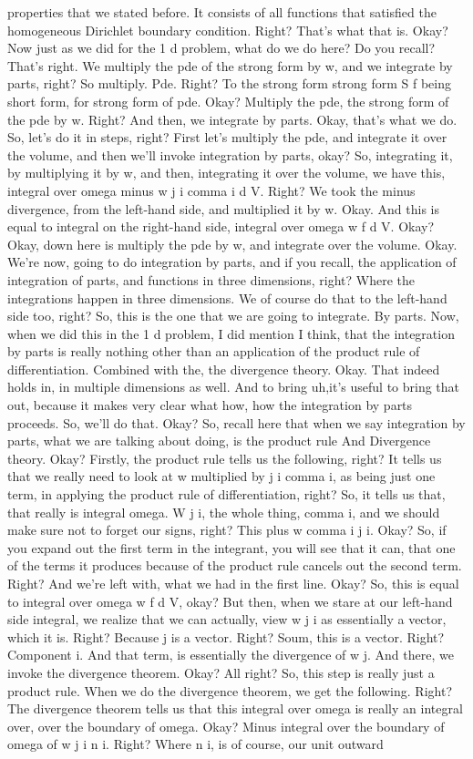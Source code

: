 \documentclass[10pt]{article}
\begin{document}
properties that we stated before. It consists of all functions that satisfied the homogeneous Dirichlet boundary condition. Right? That's what that is. Okay? Now just as we did for the 1 d problem, what do we do here? Do you recall? That's right. We multiply the pde of the strong form by w, and we integrate by parts, right? So multiply. Pde. Right? To the strong form strong form S f being short form, for strong form of pde. Okay? Multiply the pde, the strong form of the pde by w. Right? And then, we integrate by parts. Okay, that's what we do. So, let's do it in steps, right? First let's multiply the pde, and integrate it over the volume, and then we'll invoke integration by parts, okay? So, integrating it, by multiplying it by w, and then, integrating it over the volume, we have this, integral over omega minus w j i comma i d V. Right? We took the minus divergence, from the left-hand side, and multiplied it by w. Okay. And this is equal to integral on the right-hand side, integral over omega w f d V. Okay? Okay, down here is multiply the pde by w, and integrate over the volume. Okay. We're now, going to do integration by parts, and if you recall, the application of integration of parts, and functions in three dimensions, right? Where the integrations happen in three dimensions. We of course do that to the left-hand side too, right? So, this is the one that we are going to integrate. By parts. Now, when we did this in the 1 d problem, I did mention I think, that the integration by parts is really nothing other than an application of the product rule of differentiation. Combined with the, the divergence theory. Okay. That indeed holds in, in multiple dimensions as well. And to bring uh,it's useful to bring that out, because it makes very clear what how, how the integration by parts proceeds. So, we'll do that. Okay? So, recall here that when we say integration by parts, what we are talking about doing, is the product rule And Divergence theory. Okay? Firstly, the product rule tells us the following, right? It tells us that we really need to look at w multiplied by j i comma i, as being just one term, in applying the product rule of differentiation, right? So, it tells us that, that really is integral omega. W j i, the whole thing, comma i, and we should make sure not to forget our signs, right? This plus w comma i j i. Okay? So, if you expand out the first term in the integrant, you will see that it can, that one of the terms it produces because of the product rule cancels out the second term. Right? And we're left with, what we had in the first line. Okay? So, this is equal to integral over omega w f d V, okay? But then, when we stare at our left-hand side integral, we realize that we can actually, view w j i as essentially a vector, which it is. Right? Because j is a vector. Right? Soum, this is a vector. Right? Component i. And that term, is essentially the divergence of w j. And there, we invoke the divergence theorem. Okay? All right? So, this step is really just a product rule. When we do the divergence theorem, we get the following. Right? The divergence theorem tells us that this integral over omega is really an integral over, over the boundary of omega. Okay? Minus integral over the boundary of omega of w j i n i. Right? Where n i, is of course, our unit outward 
\end{document}
